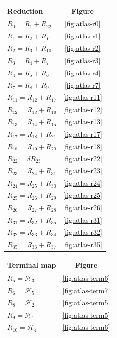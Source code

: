 \documentclass[a4paper,11pt]{amsart}
\numberwithin{equation}{subsection}
\theoremstyle{plain}
\theoremstyle{definition}
\theoremstyle{remark}
\begin{document}
\begin{center}\small
\begin{minipage}[t]{.52\linewidth}\centering
\begin{tabular}{@{}lc@{}}\toprule
Reduction&Figure\\\midrule
$R_{0}=R_{1}+R_{22}$&\ref{fig:atlas-r0}\\
$R_{1}=R_{2}+R_{11}$&\ref{fig:atlas-r1}\\
$R_{2}=R_{3}+R_{10}$&\ref{fig:atlas-r2}\\
$R_{3}=R_{4}+R_{7}$&\ref{fig:atlas-r3}\\
$R_{4}=R_{5}+R_{6}$&\ref{fig:atlas-r4}\\
$R_{7}=R_{8}+R_{9}$&\ref{fig:atlas-r7}\\
$R_{11}=R_{12}+R_{17}$&\ref{fig:atlas-r11}\\
$R_{12}=R_{13}+R_{16}$&\ref{fig:atlas-r12}\\
$R_{13}=R_{14}+R_{15}$&\ref{fig:atlas-r13}\\
$R_{17}=R_{18}+R_{21}$&\ref{fig:atlas-r17}\\
$R_{18}=R_{19}+R_{20}$&\ref{fig:atlas-r18}\\
$R_{22}=dR_{23}$&\ref{fig:atlas-r22}\\
$R_{23}=R_{24}+R_{31}$&\ref{fig:atlas-r23}\\
$R_{24}=R_{25}+R_{30}$&\ref{fig:atlas-r24}\\
$R_{25}=R_{26}+R_{29}$&\ref{fig:atlas-r25}\\
$R_{26}=R_{27}+R_{28}$&\ref{fig:atlas-r26}\\
$R_{31}=R_{32}+R_{35}$&\ref{fig:atlas-r31}\\
$R_{32}=R_{33}+R_{34}$&\ref{fig:atlas-r32}\\
$R_{35}=R_{36}+R_{37}$&\ref{fig:atlas-r35}\\
\bottomrule
\end{tabular}
\end{minipage}\hfill
\begin{minipage}[t]{.43\linewidth}\centering
\begin{tabular}{@{}lc@{}}\toprule
Terminal map&Figure\\\midrule
$R_{5}=\mathcal H_{3}$&\ref{fig:atlas-term6}\\
$R_{6}=\mathcal H_{5}$&\ref{fig:atlas-term7}\\
$R_{8}=\mathcal H_{2}$&\ref{fig:atlas-term5}\\
$R_{9}=\mathcal H_{1}$&\ref{fig:atlas-term5}\\
$R_{10}=\mathcal H_{4}$&\ref{fig:atlas-term6}\\

\end{tabular}
\end{minipage}
\end{center}
\end{document}
